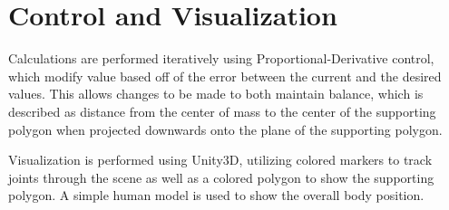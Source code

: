 \documentclass[landscape,26pt]{sciposter}
\begin{document}
\begin{minipage}[t]{14in}
	\section*{Control and Visualization}
		Calculations are performed iteratively using Proportional-Derivative control, which modify value based off of the error between the current and the desired values.  This allows changes to be made to both maintain balance, which is described as distance from the center of mass to the center of the supporting polygon when projected downwards onto the plane of the supporting polygon.

        Visualization is performed using Unity3D, utilizing colored markers to track joints through the scene as well as a colored polygon to show the supporting polygon.  A simple human model is used to show the overall body position.


\end{minipage}
\end{document}
